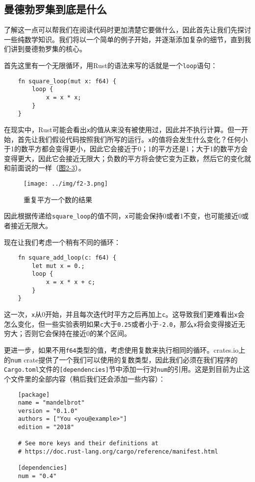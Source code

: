 \subsection{曼德勃罗集到底是什么}\label{WhatIsMand}
了解这一点可以帮我们在阅读代码时更加清楚它要做什么，因此首先让我们先探讨一些纯数学知识。我们将以一个简单的例子开始，并逐渐添加复杂的细节，直到我们讲到曼德勃罗集的核心。

首先这里有一个无限循环，用Rust的语法来写的话就是一个\texttt{loop}语句：
\begin{verbatim}
    fn square_loop(mut x: f64) {
        loop {
            x = x * x;
        }
    }
\end{verbatim}

在现实中，Rust可能会看出\texttt{x}的值从来没有被使用过，因此并不执行计算。但一开始，首先让我们假设代码按照我们所写的运行。\texttt{x}的值将会发生什么变化？任何小于1的数平方都会变得更小，因此它会接近于0；1的平方还是1；大于1的数平方会变得更大，因此它会接近无限大；负数的平方将会使它变为正数，然后它的变化就和前面说的一样（\hyperref[f2-3]{图2-3}）。
\begin{figure}[htbp]
    \centering
    \texttt{[image: ../img/f2-3.png]}
    \caption{重复平方一个数的结果}
    \label{f2-3}
\end{figure}

因此根据传递给\texttt{square\_loop}的值不同，\texttt{x}可能会保持0或者1不变，也可能接近0或者接近无限大。

现在让我们考虑一个稍有不同的循环：
\begin{verbatim}
    fn square_add_loop(c: f64) {
        let mut x = 0.;
        loop {
            x = x * x + c;
        }
    }
\end{verbatim}

这一次，\texttt{x}从0开始，并且每次迭代时平方之后再加上\texttt{c}。这导致我们更难看出\texttt{x}会怎么变化，但一些实验表明如果\texttt{c}大于\texttt{0.25}或者小于\texttt{-2.0}，那么\texttt{x}将会变得接近无穷大；否则它会保持在接近0的某个区间。

更进一步，如果不用\texttt{f64}类型的值，考虑使用复数来执行相同的循环。crates.io上的\texttt{num} crate提供了一个我们可以使用的复数类型，因此我们必须在我们程序的\texttt{Cargo.toml}文件的\texttt{[dependencies]}节中添加一行对\texttt{num}的引用。这是到目前为止这个文件里的全部内容（稍后我们还会添加一些内容）：
\begin{verbatim}
    [package]
    name = "mandelbrot"
    version = "0.1.0"
    authors = ["You <you@example>"]
    edition = "2018"

    # See more keys and their definitions at
    # https://doc.rust-lang.org/cargo/reference/manifest.html

    [dependencies]
    num = "0.4"
\end{verbatim}

